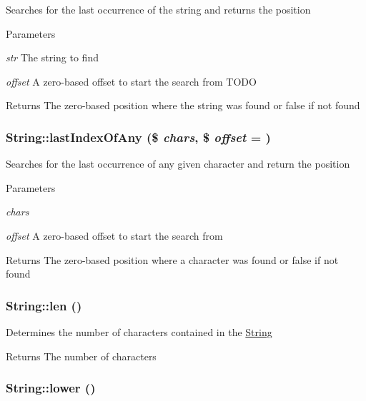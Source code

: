 \label{classString_a18806fe790375032e3fb268f649914d7}
Searches for the last occurrence of the string and returns the position 
\begin{DoxyParams}{Parameters}
\item[{\em str}]The string to find \item[{\em offset}]A zero-\/based offset to start the search from TODO \end{DoxyParams}
\begin{DoxyReturn}{Returns}
The zero-\/based position where the string was found or false if not found 
\end{DoxyReturn}
\hypertarget{classString_adbe9cb0e51c46bd16881923a7a3d2e4a}{
\subsubsection[{lastIndexOfAny}]{\setlength{\rightskip}{0pt plus 5cm}String::lastIndexOfAny (\$ {\em chars}, \/  \$ {\em offset} = {})}}
\label{classString_adbe9cb0e51c46bd16881923a7a3d2e4a}
Searches for the last occurrence of any given character and return the position 
\begin{DoxyParams}{Parameters}
\item[{\em chars}]\item[{\em offset}]A zero-\/based offset to start the search from \end{DoxyParams}
\begin{DoxyReturn}{Returns}
The zero-\/based position where a character was found or false if not found 
\end{DoxyReturn}
\hypertarget{classString_afa58fa9927bc0240baf185917c849245}{
\subsubsection[{len}]{\setlength{\rightskip}{0pt plus 5cm}String::len ()}}
\label{classString_afa58fa9927bc0240baf185917c849245}
Determines the number of characters contained in the \hyperlink{classString}{String} \begin{DoxyReturn}{Returns}
The number of characters 
\end{DoxyReturn}
\hypertarget{classString_a70de74664e69b6e2fc93d231173df0d2}{
\subsubsection[{lower}]{\setlength{\rightskip}{0pt plus 5cm}String::lower ()}}
